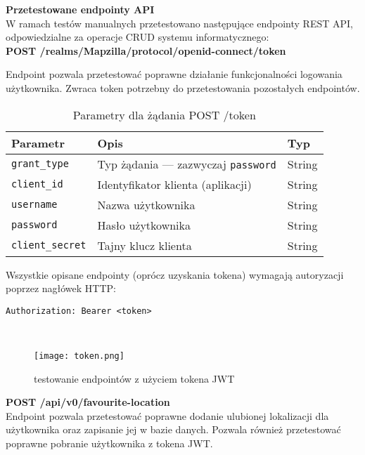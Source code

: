 \documentclass{article}
\begin{document}
\noindent\textbf{Przetestowane endpointy API} 
\\
W ramach testów manualnych przetestowano następujące endpointy REST API, odpowiedzialne za operacje CRUD systemu informatycznego:
\\

\noindent\textbf{POST /realms/Mapzilla/protocol/openid-connect/token}

\noindent Endpoint pozwala przetestować poprawne działanie funkcjonalności logowania użytkownika. Zwraca token potrzebny do przetestowania pozostałych endpointów.
\\
\begin{table}[h!]
\centering
\begin{tabular}{|l|l|l|}
\hline
\textbf{Parametr} & \textbf{Opis} & \textbf{Typ} \\
\hline
\texttt{grant\_type} & Typ żądania — zazwyczaj \texttt{password} & String \\
\texttt{client\_id} & Identyfikator klienta (aplikacji) & String \\
\texttt{username} & Nazwa użytkownika & String \\
\texttt{password} & Hasło użytkownika & String \\
\texttt{client\_secret} & Tajny klucz klienta & String \\
\hline
\end{tabular}
\caption{Parametry dla żądania POST /token}
\end{table}

\noindent
Wszystkie opisane endpointy (oprócz uzyskania tokena) wymagają autoryzacji poprzez nagłówek HTTP:

\begin{verbatim}
Authorization: Bearer <token>
\end{verbatim}
\\

\begin{figure}[H]
        \centering
        \texttt{[image: token.png]}
        \caption{testowanie endpointów z użyciem tokena JWT}
        \label{fig:enter-label}
\end{figure}

\noindent\textbf{POST /api/v0/favourite-location}
\\

\noindent
Endpoint pozwala przetestować poprawne dodanie ulubionej lokalizacji dla użytkownika oraz zapisanie jej w bazie danych. Pozwala również przetestować poprawne pobranie użytkownika z tokena JWT.
\end{document}
